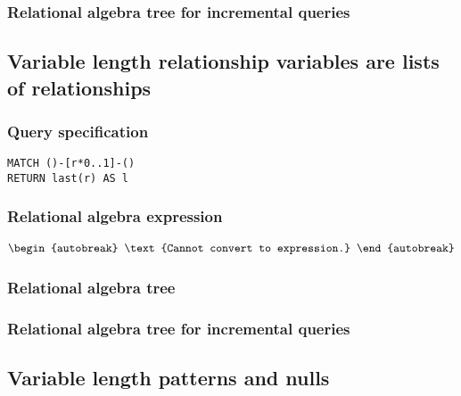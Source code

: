 \subsubsection*{Relational algebra tree for incremental queries}


\subsection{Variable length relationship variables are lists of relationships}

\subsubsection*{Query specification}

\begin{lstlisting}
MATCH ()-[r*0..1]-()
RETURN last(r) AS l
\end{lstlisting}

\subsubsection*{Relational algebra expression}

\begin{align*}
\begin{autobreak}
\text{Cannot convert to expression.}
\end{autobreak}
\end{align*}

\subsubsection*{Relational algebra tree}


\subsubsection*{Relational algebra tree for incremental queries}


\subsection{Variable length patterns and nulls}

